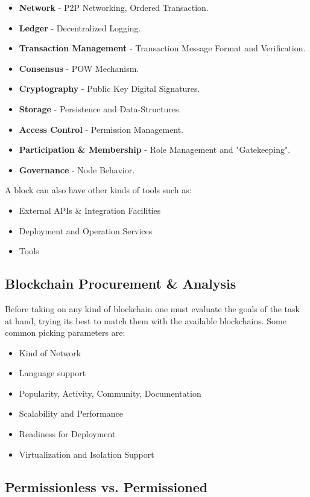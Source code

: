 \begin{itemize}
    \item \textbf{Network} - P2P Networking, Ordered Transaction.
    \item \textbf{Ledger} - Decentralized Logging.
    \item \textbf{Transaction Management} - Transaction Message Format and Verification.
    \item \textbf{Consensus} - POW Mechanism.
    \item \textbf{Cryptography} - Public Key Digital Signatures.
    \item \textbf{Storage} - Persistence and Data-Structures.
    \item \textbf{Access Control} - Permission Management.
    \item \textbf{Participation \& Membership} - Role Management and "Gatekeeping".
    \item \textbf{Governance} - Node Behavior.
\end{itemize}

A block can also have other kinds of tools such as:
\begin{itemize}
    \item External APIs \& Integration Facilities
    \item Deployment and Operation Services
    \item Tools
\end{itemize}

\subsection{Blockchain Procurement \& Analysis}
Before taking on any kind of blockchain one must evaluate the goals of the task at hand,
trying its best to match them with the available blockchains.
Some common picking parameters are:
\begin{itemize}
    \item Kind of Network
    \item Language support
    \item Popularity, Activity, Community, Documentation
    \item Scalability and Performance
    \item Readiness for Deployment
    \item Virtualization and Isolation Support
\end{itemize}

\subsection{Permissionless vs. Permissioned}
